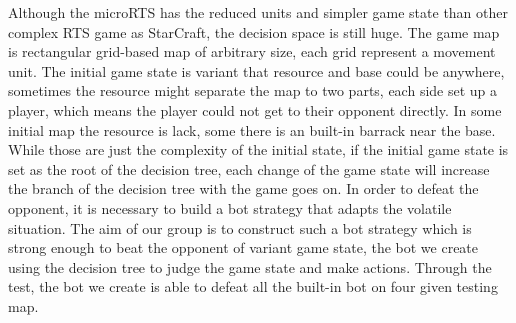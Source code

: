 Although the microRTS has the reduced units and simpler game state than other complex RTS game as StarCraft,
the decision space is still huge. The game map is rectangular grid-based map of arbitrary size, each grid represent
a movement unit. The initial game state is variant that resource and base could be anywhere, sometimes the resource
might separate the map to two parts, each side set up a player, which means the player could not get to their opponent
directly. In some initial map the resource is lack, some there is an built-in barrack near the base. While those are
just the complexity of the initial state, if the initial game state is set as the root of the decision tree, each
change of the game state will increase the branch of the decision tree with the game goes on. In order to defeat
the opponent, it is necessary to build a bot strategy that adapts the volatile situation. The aim of our group is
to construct such a bot strategy which is strong enough to beat the opponent of variant game state, the bot we create
using the decision tree to judge the game state and make actions. Through the test, the bot we create is able to defeat
all the built-in bot on four given testing map.
